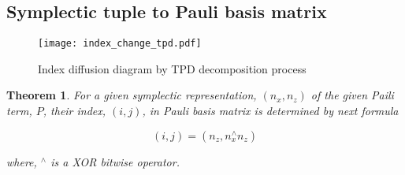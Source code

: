 \documentclass[twocolumn]{article}
\newtheorem{theorem}{Theorem}
\begin{document}
\subsection{Symplectic tuple to Pauli basis matrix}

\begin{figure}
    \texttt{[image: index\_change\_tpd.pdf]}
    \caption{Index diffusion diagram by TPD decomposition process}
    \label{fig:index_change_tpd}
\end{figure}

\begin{theorem}
    \label{thm:index_conversion}
    For a given symplectic representation, $(n_x, n_z)$ of the given Paili term, $P$,
    their index, $(i, j)$, in Pauli basis matrix is determined by next formula

    \begin{equation}
        \label{eq:ij_nznx}
        (i, j) = (n_z, n_x^\wedge n_z)
    \end{equation}

    where, ${}^\wedge$ is a XOR bitwise operator. 
\end{theorem}
\end{document}
